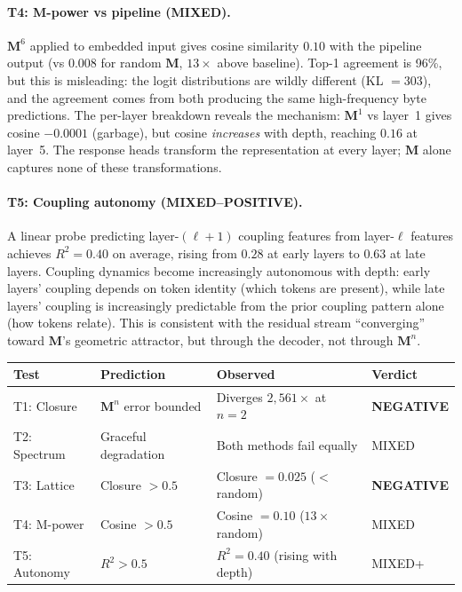 \documentclass[11pt, a4paper]{article}
\newcommand{\M}{\mathbf{M}}
\theoremstyle{plain}
\theoremstyle{remark}
\begin{document}
\paragraph{T4: M-power vs pipeline (MIXED).}
$\M^6$ applied to embedded input gives cosine similarity $0.10$ with the pipeline output (vs $0.008$ for random $\M$, $13\times$ above baseline).
Top-1 agreement is 96\%, but this is misleading: the logit distributions are wildly different (KL $= 303$), and the agreement comes from both producing the same high-frequency byte predictions.
The per-layer breakdown reveals the mechanism: $\M^1$ vs layer~1 gives cosine $-0.0001$ (garbage), but cosine \emph{increases} with depth, reaching $0.16$ at layer~5.
The response heads transform the representation at every layer; $\M$ alone captures none of these transformations.

\paragraph{T5: Coupling autonomy (MIXED--POSITIVE).}
A linear probe predicting layer-$(\ell{+}1)$ coupling features from layer-$\ell$ features achieves $R^2 = 0.40$ on average, rising from $0.28$ at early layers to $0.63$ at late layers.
Coupling dynamics become increasingly autonomous with depth: early layers' coupling depends on token identity (which tokens are present), while late layers' coupling is increasingly predictable from the prior coupling pattern alone (how tokens relate).
This is consistent with the residual stream ``converging'' toward $\M$'s geometric attractor, but through the decoder, not through $\M^n$.

\begin{center}\small
\begin{tabular}{@{}llll@{}}
\toprule
\textbf{Test} & \textbf{Prediction} & \textbf{Observed} & \textbf{Verdict} \\
\midrule
T1: Closure & $\M^n$ error bounded & Diverges $2{,}561\times$ at $n{=}2$ & {\color{red}\textbf{NEGATIVE}} \\
T2: Spectrum & Graceful degradation & Both methods fail equally & MIXED \\
T3: Lattice & Closure $> 0.5$ & Closure $= 0.025$ ($< $ random) & {\color{red}\textbf{NEGATIVE}} \\
T4: M-power & Cosine $> 0.5$ & Cosine $= 0.10$ ($13\times$ random) & MIXED \\
T5: Autonomy & $R^2 > 0.5$ & $R^2 = 0.40$ (rising with depth) & MIXED+ \\
\bottomrule
\end{tabular}
\end{center}
\end{document}
